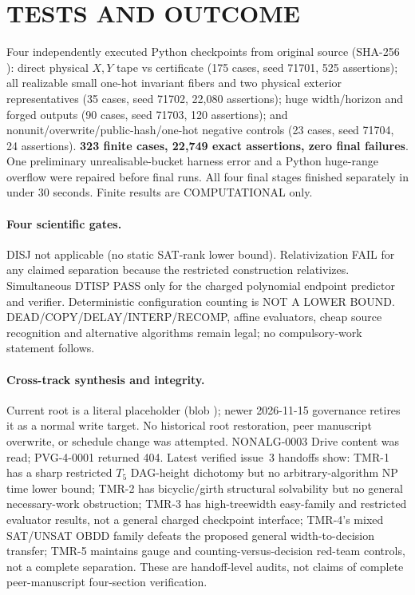 \documentclass[11pt]{article}
\begin{document}
\section{TESTS AND OUTCOME}
Four independently executed Python checkpoints from original source  (SHA-256 ): direct physical $X,Y$ tape vs certificate (175 cases, seed 71701, 525 assertions); all realizable small one-hot invariant fibers and two physical exterior representatives (35 cases, seed 71702, 22,080 assertions); huge width/horizon and forged outputs (90 cases, seed 71703, 120 assertions); and nonunit/overwrite/public-hash/one-hot negative controls (23 cases, seed 71704, 24 assertions). \textbf{323 finite cases, 22,749 exact assertions, zero final failures}. One preliminary unrealisable-bucket harness error and a Python huge-range overflow were repaired before final runs. All four final stages finished separately in under 30 seconds. Finite results are COMPUTATIONAL only.

\paragraph{Four scientific gates.}
DISJ not applicable (no static SAT-rank lower bound). Relativization FAIL for any claimed separation because the restricted construction relativizes. Simultaneous DTISP PASS only for the charged polynomial endpoint predictor and verifier. Deterministic configuration counting is NOT A LOWER BOUND. DEAD/COPY/DELAY/INTERP/RECOMP, affine evaluators, cheap source recognition and alternative algorithms remain legal; no compulsory-work statement follows.

\paragraph{Cross-track synthesis and integrity.}
Current root  is a literal placeholder (blob ); newer 2026-11-15 governance retires it as a normal write target. No historical root restoration, peer manuscript overwrite, or schedule change was attempted. NONALG-0003 Drive content was read; PVG-4-0001 returned 404. Latest verified issue~3 handoffs show: TMR-1 has a sharp restricted $T_5$ DAG-height dichotomy but no arbitrary-algorithm NP time lower bound; TMR-2 has bicyclic/girth structural solvability but no general necessary-work obstruction; TMR-3 has high-treewidth easy-family and restricted evaluator results, not a general charged checkpoint interface; TMR-4's mixed SAT/UNSAT OBDD family defeats the proposed general width-to-decision transfer; TMR-5 maintains gauge and counting-versus-decision red-team controls, not a complete separation. These are handoff-level audits, not claims of complete peer-manuscript four-section verification.
\end{document}
